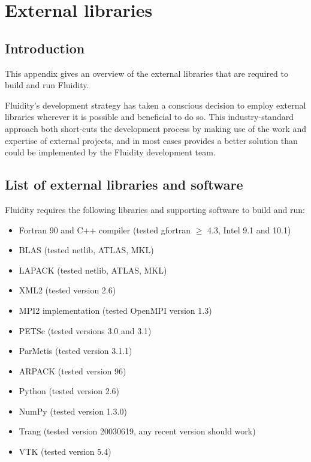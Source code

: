 \chapter{External libraries}\label{chap:external}

\section{Introduction}

This appendix gives an overview of the external libraries that are required to
build and run Fluidity.

Fluidity's development strategy has taken a conscious decision to employ
external libraries wherever it is possible and beneficial to do so. This
industry-standard approach both short-cuts the development process by making
use of the work and expertise of external projects, and in most cases provides
a better solution than could be implemented by the Fluidity development team.

\section{List of external libraries and software}
\label{sect:required_ḻibraries_list}

Fluidity requires the following libraries and supporting software to build and
run:

\begin{itemize}
\item Fortran 90 and C++ compiler (tested gfortran $\geq$ 4.3, Intel 9.1 and 10.1)
\item BLAS (tested netlib, ATLAS, MKL)
\item LAPACK (tested netlib, ATLAS, MKL)
\item XML2 (tested version 2.6)
\item MPI2 implementation (tested OpenMPI version 1.3)
\item PETSc (tested versions 3.0 and 3.1)
\item ParMetis (tested version 3.1.1)
\item ARPACK (tested version 96)
\item Python (tested version 2.6) 
\item NumPy (tested version 1.3.0)
\item Trang (tested version 20030619, any recent version should work)
\item VTK (tested version 5.4)
\end{itemize}

